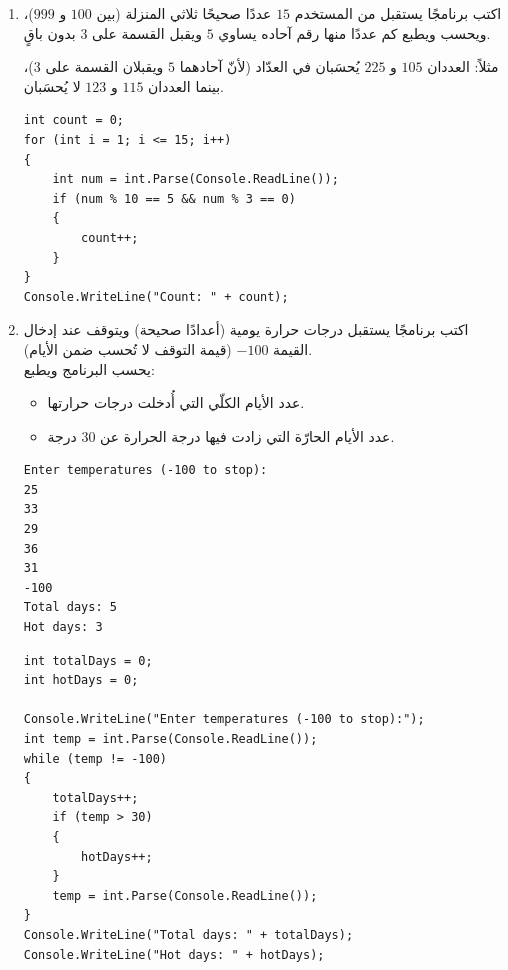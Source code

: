 \documentclass[14pt]{extarticle}
\begin{document}
\begin{enumerate}[itemsep=2em]
\item اكتب برنامجًا يستقبل من المستخدم $15$ عددًا صحيحًا ثلاثي المنزلة (بين $100$ و $999$)، ويحسب ويطبع كم عددًا منها رقم آحاده يساوي $5$ ويقبل القسمة على $3$ بدون باقٍ.
\ifdetailed
\begin{boxExample}
مثلاً: العددان $105$ و $225$ يُحسَبان في العدّاد (لأنّ آحادهما $5$ ويقبلان القسمة على $3$)، بينما العددان $115$ و $123$ لا يُحسَبان.
\end{boxExample}
\fi
\ifwithsols
\begin{boxSolution}
\begin{english}
\begin{verbatim}
int count = 0;
for (int i = 1; i <= 15; i++)
{
    int num = int.Parse(Console.ReadLine());
    if (num % 10 == 5 && num % 3 == 0)
    {
        count++;
    }
}
Console.WriteLine("Count: " + count);
\end{verbatim}
\end{english}
\end{boxSolution}
\fi
\filbreak

\item اكتب برنامجًا يستقبل درجات حرارة يومية (أعدادًا صحيحة) ويتوقف عند إدخال القيمة $-100$ (قيمة التوقف لا تُحسب ضمن الأيام). \\
يحسب البرنامج ويطبع:
\begin{itemize}[nosep]
    \item عدد الأيام الكلّي التي أُدخلت درجات حرارتها.
    \item عدد الأيام الحارّة التي زادت فيها درجة الحرارة عن $30$ درجة.
\end{itemize}
\ifdetailed
\begin{boxExample}
\begin{english}
\begin{verbatim}
Enter temperatures (-100 to stop):
25
33
29
36
31
-100
Total days: 5
Hot days: 3
\end{verbatim}
\end{english}
\end{boxExample}
\fi
\ifwithsols
\begin{boxSolution}
\begin{english}
\begin{verbatim}
int totalDays = 0;
int hotDays = 0;

Console.WriteLine("Enter temperatures (-100 to stop):");
int temp = int.Parse(Console.ReadLine());
while (temp != -100)
{
    totalDays++;
    if (temp > 30)
    {
        hotDays++;
    }
    temp = int.Parse(Console.ReadLine());
}
Console.WriteLine("Total days: " + totalDays);
Console.WriteLine("Hot days: " + hotDays);
\end{verbatim}
\end{english}
\end{boxSolution}
\fi
\filbreak


\end{enumerate}
\end{document}

